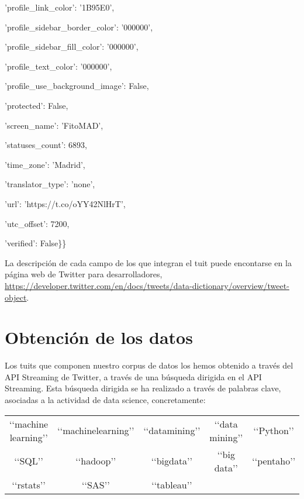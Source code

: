 \hspace{1.7cm}'profile\_link\_color': '1B95E0',

\hspace{1.7cm}'profile\_sidebar\_border\_color': '000000',

\hspace{1.7cm}'profile\_sidebar\_fill\_color': '000000',

\hspace{1.7cm}'profile\_text\_color': '000000',

\hspace{1.7cm}'profile\_use\_background\_image': False,

\hspace{1.7cm}'protected': False,

\hspace{1.7cm}'screen\_name': 'FitoMAD',

\hspace{1.7cm}'statuses\_count': 6893,

\hspace{1.7cm}'time\_zone': 'Madrid',

\hspace{1.7cm}'translator\_type': 'none',

\hspace{1.7cm}'url': 'https://t.co/oYY42NlHrT',

\hspace{1.7cm}'utc\_offset': 7200,

\hspace{1.7cm}'verified': False\}\}

\bigskip

La descripción de cada campo de los que integran el tuit puede encontarse en la página web de Twitter para 
desarrolladores, \url{https://developer.twitter.com/en/docs/tweets/data-dictionary/overview/tweet-object}.

\section{Obtenci\'on de los datos}
\label{sect:obtencion_datos}
Los tuits que componen nuestro corpus de datos los hemos obtenido a través del API Streaming
de Twitter, a través de una búsqueda dirigida en el API Streaming. Esta búsqueda dirigida 
se ha realizado a través de palabras clave, asociadas a la actividad de data science, concretamente:

\begin{center}
\begin{tabular}{ccccc}
\lq\lq machine learning\rq\rq  &\lq\lq machinelearning\rq\rq  &\lq\lq datamining\rq\rq  &\lq\lq data mining\rq\rq 
&\lq\lq Python\rq\rq\\
\lq\lq SQL\rq\rq & \lq\lq hadoop\rq\rq  &\lq\lq bigdata\rq\rq  &\lq\lq big data\rq\rq  &\lq\lq pentaho\rq\rq\\
\lq\lq rstats\rq\rq &\lq\lq SAS\rq\rq &\lq\lq tableau\rq\rq
\end{tabular}
\end{center}

